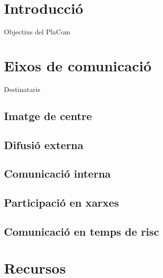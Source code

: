 \documentclass[fontsize=10pt,%
paper=a4,%
DIV=14,%
twoside,%
pagesize=auto,%
parskip=half,
captions=tableheading,%
numbers=noenddot,%
toc=graduated%
]{scrartcl}
\begin{document}



\thispagestyle{empty}
\setcounter{tocdepth}{4}
\tableofcontents

\clearpage

\pagestyle{scrheadings}


\section{Introducció}\label{sec:intro}

Objectius del PlaCom

\section{Eixos de comunicació}\label{sec:eixos}

Destinataris

\subsection{Imatge de centre}

\subsection{Difusió externa}

\subsection{Comunicació interna}

\subsection{Participació en xarxes}

\subsection{Comunicació en temps de risc}

\section{Recursos}\label{sec:recursos}
\end{document}
